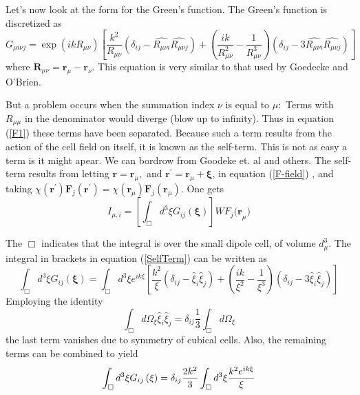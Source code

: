 \documentclass{article}
\begin{document}
Let's now look at the form for the Green's function. The Green's function is
discretized as 
\begin{equation}
G_{\mu i\nu j}=\exp (ikR_{\mu \nu })\left[ \frac{k^{2}}{R_{\mu \nu }}\left(
\delta _{ij}-\widehat{R_{\mu \nu i}}\widehat{R_{\mu \nu j}}\right) +\left( 
\frac{ik}{R_{\mu \nu }^{2}}-\frac{1}{R_{\mu \nu }^{3}}\right) \left( \delta
_{ij}-3\widehat{R_{\mu \nu i}}\widehat{R_{\mu \nu j}}\right) \right]
\end{equation}%
where $\mathbf{R}_{\mu \nu }=\mathbf{r}_{\mu }-\mathbf{r}_{\nu }.$ This
equation is very similar to that used by Goedecke and O'Brien.\cite%
{Goedecke88}

But a problem occurs when the summation index $\nu $ is equal to $\mu :$
Terms with $R_{\mu \mu }$ in the denominator would diverge (blow up to
infinity). Thus in equation (\ref{F1}) these terms have been separated.
Because such a term results from the action of the cell field on itself, it
is known as the self-term. This is not as easy a term is it might apear. We
can bordrow from Goodeke et. al\cite{Goedecke88} and others. The self-term
results from letting $\mathbf{r}=\mathbf{r}_{\mu },$ and $\mathbf{r}^{\prime
}=\mathbf{r}_{\mu }+\mathbf{\xi }$, in equation (\ref{F-field}) , and taking 
$\chi \left( \mathbf{r}^{\prime }\right) \mathbf{F}_{j}\left( \mathbf{r}%
^{\prime }\right) =\chi \left( \mathbf{r}_{\mu }\right) \mathbf{F}_{j}\left( 
\mathbf{r}_{\mu }\right) .$ One gets 
\begin{equation}
I_{\mu ,i}=\left[ \int_{\Box }d^{3}\xi G_{ij}\left( \mathbf{\xi }\right) %
\right] WF_{j}\mathbf{(r}_{\mu })
\end{equation}

The $\Box $ indicates that the integral is over the small dipole cell, of
volume $d_{\mu }^{3}.$ The integral in brackets in equation (\ref{SelfTerm})
can be written as 
\begin{equation}
\int_{\Box }d^{3}\xi G_{ij}\left( \mathbf{\xi }\right) =\int_{\Box }d^{3}\xi
e^{ik\xi }\left[ \frac{k^{2}}{\xi }\left( \delta _{ij}-\hat{\xi}_{i}\hat{\xi}%
_{j}\right) +\left( \frac{ik}{\xi ^{2}}-\frac{1}{\xi ^{3}}\right) \left(
\delta _{ij}-3\hat{\xi}_{i}\hat{\xi}_{j}\right) \right]
\end{equation}
Employing the identity 
\begin{equation}
\int_{\Box }d\Omega _{\xi }\hat{\xi}_{i}\hat{\xi}_{j}=\delta _{ij}\frac{1}{3}%
\int_{\Box }d\Omega _{\xi }
\end{equation}
the last term vanishes due to symmetry of cubical cells. Also, the remaining
terms can be combined to yield 
\begin{equation}
\int_{\Box }d^{3}\xi G_{ij}\left( \mathbf{\xi }\right) =\delta _{ij}\frac{%
2k^{2}}{3}\int_{\Box }d^{3}\xi \frac{k^{2}e^{ik\xi }}{\xi }
\end{equation}
\end{document}
